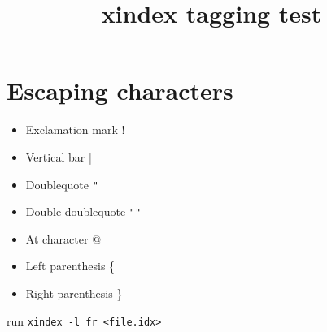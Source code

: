 \documentclass{article}
\title{xindex tagging test}
\begin{document}
\section{Escaping characters}
\begin{itemize}
\item Exclamation mark ! 
\item Vertical bar | 
\item Doublequote \verb|"| 
\item Double doublequote \verb|""| 
\item At character @ 
\item Left parenthesis \{ \index{\braceLeft}
\item Right parenthesis \} \index{\braceRight}
\end{itemize}
run \texttt{xindex -l fr <file.idx>}
 

\printindex
\end{document}

